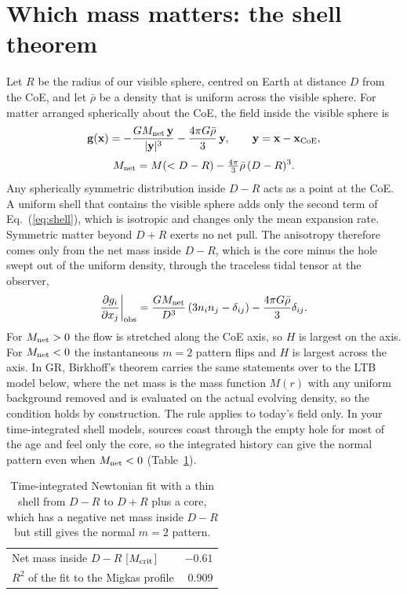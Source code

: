 \documentclass[10pt,twocolumn,letterpaper]{article}
\begin{document}
\section{Which mass matters: the shell theorem}
Let $R$ be the radius of our visible sphere, centred on Earth at distance $D$ from the CoE, and let $\bar\rho$ be a density that is uniform across the visible sphere. For matter arranged spherically about the CoE, the field inside the visible sphere is
\begin{equation}\label{eq:shell}
\mathbf g(\mathbf x)=-\frac{GM_{\rm net}\,\mathbf y}{|\mathbf y|^{3}}-\frac{4\pi G\bar\rho}{3}\,\mathbf y,\qquad \mathbf y=\mathbf x-\mathbf x_{\rm CoE},
\end{equation}
\begin{equation}\label{eq:mnet}
M_{\rm net}=M(<D-R)-\tfrac{4\pi}{3}\bar\rho\,(D-R)^3 .
\end{equation}
Any spherically symmetric distribution inside $D-R$ acts as a point at the CoE. A uniform shell that contains the visible sphere adds only the second term of Eq.~(\ref{eq:shell}), which is isotropic and changes only the mean expansion rate. Symmetric matter beyond $D+R$ exerts no net pull. The anisotropy therefore comes only from the net mass inside $D-R$, which is the core minus the hole swept out of the uniform density, through the traceless tidal tensor at the observer,
\begin{equation}\label{eq:tide}
\frac{\partial g_i}{\partial x_j}\bigg|_{\rm obs}=\frac{GM_{\rm net}}{D^3}\left(3n_in_j-\delta_{ij}\right)-\frac{4\pi G\bar\rho}{3}\delta_{ij}.
\end{equation}
For $M_{\rm net}>0$ the flow is stretched along the CoE axis, so $H$ is largest on the axis. For $M_{\rm net}<0$ the instantaneous $m=2$ pattern flips and $H$ is largest across the axis. In GR, Birkhoff's theorem carries the same statements over to the LTB model below, where the net mass is the mass function $M(r)$ with any uniform background removed and is evaluated on the actual evolving density, so the condition holds by construction. The rule applies to today's field only. In your time-integrated shell models, sources coast through the empty hole for most of the age and feel only the core, so the integrated history can give the normal pattern even when $M_{\rm net}<0$ (Table~\ref{tab:hist}).

\begin{table}[htbp]\centering\footnotesize
\caption{Time-integrated Newtonian fit with a thin shell from $D-R$ to $D+R$ plus a core, which has a negative net mass inside $D-R$ but still gives the normal $m=2$ pattern.}\label{tab:hist}
\begin{tabular}{@{}lr@{}}\toprule
Net mass inside $D-R$ [$M_{\rm crit}$] & $-0.61$\\
$R^2$ of the fit to the Migkas profile & 0.909\\\bottomrule
\end{tabular}\end{table}
\end{document}
